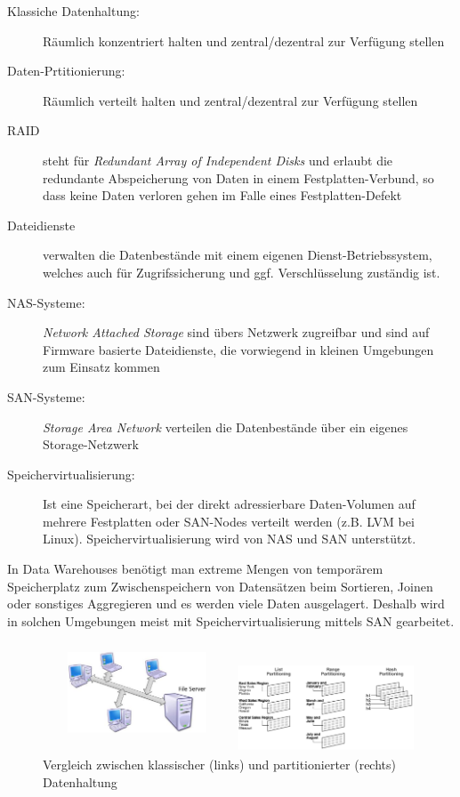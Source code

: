 \documentclass[a4paper, 11pt, nofootinbib]{article}
\begin{document}
\begin{description}
	\item[Klassiche Datenhaltung: ] Räumlich konzentriert halten und zentral/dezentral zur Verfügung stellen
	\item[Daten-Prtitionierung: ] Räumlich verteilt halten und zentral/dezentral zur Verfügung stellen
	\item[RAID] steht für \textit{Redundant Array of Independent Disks} und erlaubt die redundante Abspeicherung von Daten in einem Festplatten-Verbund, so dass keine Daten verloren gehen im Falle eines Festplatten-Defekt
	\item[Dateidienste ] verwalten die Datenbestände mit einem eigenen Dienst-Betriebssystem, welches auch für Zugrifssicherung und ggf. Verschlüsselung zuständig ist.
	\item[NAS-Systeme: ] \textit{Network Attached Storage} sind übers Netzwerk zugreifbar und sind auf Firmware basierte Dateidienste, die vorwiegend in kleinen Umgebungen zum Einsatz kommen
	\item[SAN-Systeme: ] \textit{Storage Area Network} verteilen die Datenbestände über ein eigenes Storage-Netzwerk
	\item[Speichervirtualisierung: ] Ist eine Speicherart, bei der direkt adressierbare Daten-Volumen auf mehrere Festplatten oder SAN-Nodes verteilt werden (z.B. LVM bei Linux). Speichervirtualisierung wird von NAS und SAN unterstützt.
\end{description}

\noindent In Data Warehouses benötigt man extreme Mengen von temporärem Speicherplatz zum Zwischenspeichern von Datensätzen beim Sortieren, Joinen oder sonstiges Aggregieren und es werden viele Daten ausgelagert. Deshalb wird in solchen Umgebungen meist mit Speichervirtualisierung mittels SAN gearbeitet.

\begin{figure}[htb]
	\centering
	\includegraphics[keepaspectratio=true,height=9\baselineskip]{storage.png}
	\caption{Vergleich zwischen klassischer (links) und partitionierter (rechts) Datenhaltung}
	\label{fig:storage}
\end{figure}
\end{document}
